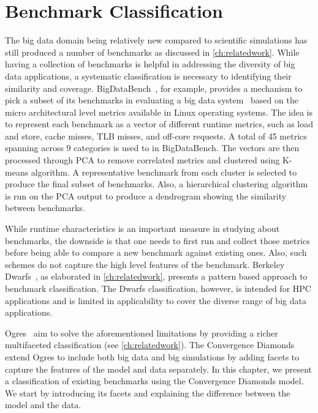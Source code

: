 \chapter{Benchmark Classification}
\label{ch:bmclassification}

The big data domain being relatively new compared to scientific simulations has still produced a number of benchmarks as discussed in \cref{ch:relatedwork}. While having a collection of benchmarks is helpful in addressing the diversity of big data applications, a systematic classification is necessary to identifying their similarity and coverage. BigDataBench~\cite{handbookofbigdatabench}, for example, provides a mechanism to pick a subset of its benchmarks in evaluating a big data system~\cite{DBLP:journals/corr/JiaZWHMYLL14} based on the micro architectural level  metrics available in Linux operating systems. The idea is to represent each benchmark as a vector of different runtime metrics, such as load and store, cache misses, \ac{TLB} misses, and off-core requests. A total of 45 metrics spanning across 9 categories is used to in BigDataBench. The vectors are then processed through \ac{PCA} to remove correlated metrics and clustered using K-means algorithm. A representative benchmark from each cluster is selected to produce the final subset of benchmarks. Also, a hierarchical clustering algorithm is run on the \ac{PCA} output to produce a dendrogram showing the similarity between benchmarks. 

While runtime characteristics is an important measure in studying about benchmarks, the downside is that one needs to first run and collect those metrics before being able to compare a new benchmark against existing ones. Also, such schemes do not capture the high level features of the benchmark. Berkeley Dwarfs~\cite{Asanovic:2009:VPC:1562764.1562783}, as elaborated in \cref{ch:relatedwork}, presents a pattern based approach to benchmark classification. The Dwarfs classification, however, is intended for \ac{HPC} applications and is limited in applicability to cover the diverse range of big data applications. 

Ogres~\cite{ogres} aim to solve the aforementioned limitations by providing a richer multifaceted classification (see \cref{ch:relatedwork}). The Convergence Diamonds~\cite{diamonds} extend Ogres to include both big data and big simulations by adding facets to capture the features of the model and data separately. In this chapter, we present a classification of existing benchmarks using the Convergence Diamonds model. We start by introducing its facets and explaining the difference between the model and the data.

